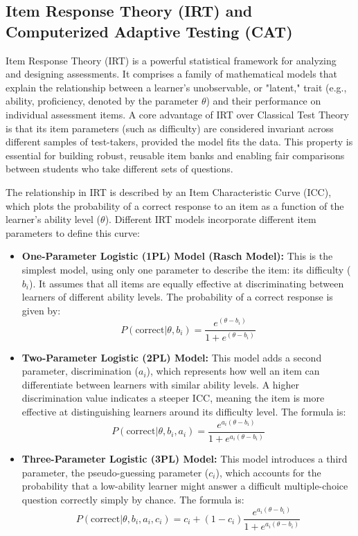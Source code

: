 \documentclass{article}
\begin{document}
\subsection{Item Response Theory (IRT) and Computerized Adaptive Testing (CAT)}

Item Response Theory (IRT) is a powerful statistical framework for analyzing and designing assessments.\cite{68} It comprises a family of mathematical models that explain the relationship between a learner's unobservable, or "latent," trait (e.g., ability, proficiency, denoted by the parameter $ \theta $) and their performance on individual assessment items.\cite{69, 70} A core advantage of IRT over Classical Test Theory is that its item parameters (such as difficulty) are considered invariant across different samples of test-takers, provided the model fits the data. This property is essential for building robust, reusable item banks and enabling fair comparisons between students who take different sets of questions.\cite{70, 71}

The relationship in IRT is described by an Item Characteristic Curve (ICC), which plots the probability of a correct response to an item as a function of the learner's ability level ($ \theta $).\cite{69} Different IRT models incorporate different item parameters to define this curve:

\begin{itemize}
    \item \textbf{One-Parameter Logistic (1PL) Model (Rasch Model):} This is the simplest model, using only one parameter to describe the item: its difficulty ($b_i$). It assumes that all items are equally effective at discriminating between learners of different ability levels.\cite{69, 72, 73, 74} The probability of a correct response is given by:
    \[P(\text{correct} | \theta, b_i) = \frac{e^{(\theta - b_i)}}{1 + e^{(\theta - b_i)}}\]
    \item \textbf{Two-Parameter Logistic (2PL) Model:} This model adds a second parameter, discrimination ($a_i$), which represents how well an item can differentiate between learners with similar ability levels. A higher discrimination value indicates a steeper ICC, meaning the item is more effective at distinguishing learners around its difficulty level.\cite{69, 74} The formula is:
    \[P(\text{correct} | \theta, b_i, a_i) = \frac{e^{a_i(\theta - b_i)}}{1 + e^{a_i(\theta - b_i)}}\]
    \item \textbf{Three-Parameter Logistic (3PL) Model:} This model introduces a third parameter, the pseudo-guessing parameter ($c_i$), which accounts for the probability that a low-ability learner might answer a difficult multiple-choice question correctly simply by chance.\cite{69, 71, 74, 75} The formula is:
    \[ P(\text{correct} | \theta, b_i, a_i, c_i) = c_i + (1 - c_i) \frac{e^{a_i(\theta - b_i)}}{1 + e^{a_i(\theta - b_i)}} \]
\end{itemize}
\end{document}
